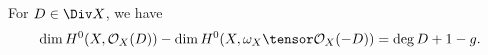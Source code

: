 For $D \in \Div X$, we have
\[ \dim H^0(X, \mathcal{O}_X(D)) - \dim H^0(X, \omega_X\tensor \mathcal{O}_X(-D)) = \deg D + 1 - g. \]
